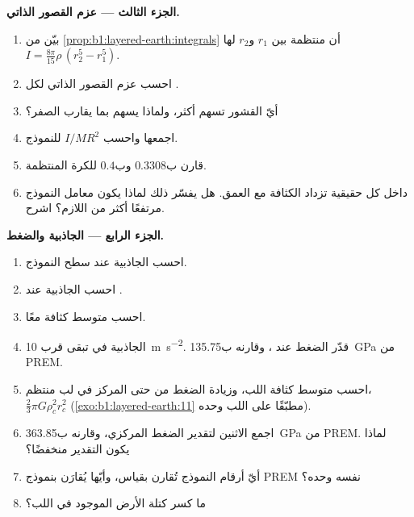 \begin{problem}
\noindent\textbf{الجزء الثالث --- عزم القصور الذاتي.}
\begin{enumerate}[resume]
  \item بيّن من \cref{prop:b1:layered-earth:integrals} أن  منتظمة بين $r_1$ و$r_2$ لها $I = \tfrac{8\pi}{15}\rho\,(r_2^5 - r_1^5)$.
  \item احسب عزم القصور الذاتي لكل .
  \item أيّ القشور تسهم أكثر، ولماذا يسهم  بما يقارب الصفر؟
  \item اجمعها واحسب $I/MR^2$ للنموذج.
  \item قارن ب$0.3308$ وب$0.4$ للكرة المنتظمة.
  \item داخل كل  حقيقية تزداد الكثافة مع العمق. هل يفسّر ذلك لماذا يكون معامل النموذج مرتفعًا أكثر من اللازم؟ اشرح.
\end{enumerate}

\noindent\textbf{الجزء الرابع --- الجاذبية والضغط.}
\begin{enumerate}[resume]
  \item احسب الجاذبية عند سطح النموذج.
  \item احسب الجاذبية عند .
  \item احسب متوسط كثافة   معًا.
  \item الجاذبية في  تبقى قرب \qty{10}{m.s^{-2}}. قدّر الضغط عند ، وقارنه ب\qty{135.75}{GPa} من PREM.
  \item احسب متوسط كثافة اللب، وزيادة الضغط من  حتى المركز في لب منتظم، $\tfrac23\pi G\rho_c^2 r_c^2$ (\cref{exo:b1:layered-earth:11} مطبّقًا على اللب وحده).
  \item اجمع الاثنين لتقدير الضغط المركزي، وقارنه ب\qty{363.85}{GPa} من PREM. لماذا يكون التقدير منخفضًا؟
  \item أيّ أرقام النموذج تُقارن بقياس، وأيّها يُقارَن بنموذج PREM نفسه وحده؟
  \item ما كسر كتلة الأرض الموجود في اللب؟
\end{enumerate}
\end{problem}
